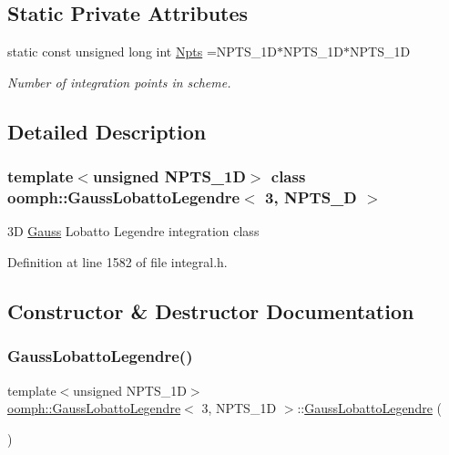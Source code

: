 \subsection*{Static Private Attributes}
\begin{DoxyCompactItemize}
\item 
static const unsigned long int \hyperlink{classoomph_1_1GaussLobattoLegendre_3_013_00_01NPTS__1D_01_4_a8c36b09f421300c58ee207ed82c049c4}{Npts} =N\+P\+T\+S\+\_\+1D$\ast$N\+P\+T\+S\+\_\+1D$\ast$N\+P\+T\+S\+\_\+1D
\begin{DoxyCompactList}\small\item\em Number of integration points in scheme. \end{DoxyCompactList}\end{DoxyCompactItemize}


\subsection{Detailed Description}
\subsubsection*{template$<$unsigned N\+P\+T\+S\+\_\+1D$>$\newline
class oomph\+::\+Gauss\+Lobatto\+Legendre$<$ 3, N\+P\+T\+S\+\_\+D $>$}

3D \hyperlink{classoomph_1_1Gauss}{Gauss} Lobatto Legendre integration class 

Definition at line 1582 of file integral.\+h.



\subsection{Constructor \& Destructor Documentation}
\mbox{\label{classoomph_1_1GaussLobattoLegendre_3_013_00_01NPTS__1D_01_4_a4e9d5640c195c310cd0255a20137c627}} 
\subsubsection{\texorpdfstring{Gauss\+Lobatto\+Legendre()}{GaussLobattoLegendre()}}
{\footnotesize\ttfamily template$<$unsigned N\+P\+T\+S\+\_\+1D$>$ \\
\hyperlink{classoomph_1_1GaussLobattoLegendre}{oomph\+::\+Gauss\+Lobatto\+Legendre}$<$ 3, N\+P\+T\+S\+\_\+1D $>$\+::\hyperlink{classoomph_1_1GaussLobattoLegendre}{Gauss\+Lobatto\+Legendre} (\begin{DoxyParamCaption}{ }\end{DoxyParamCaption})}



